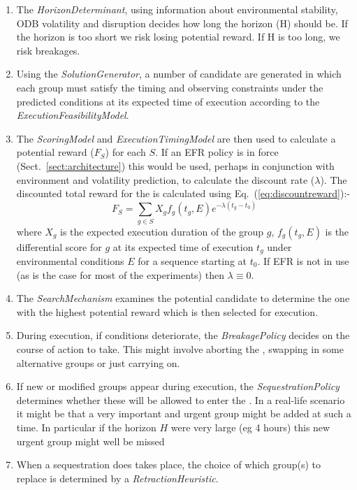 \begin{enumerate}
\item The \emph{HorizonDeterminant}, using information about environmental stability, ODB volatility and disruption decides how long the \echelon horizon (H) should be. If the horizon is too short we risk losing potential reward. If H is too long, we risk breakages.

\item Using the \emph{SolutionGenerator}, a number of candidate \echelons are generated in which each group must satisfy the timing and observing constraints under the predicted conditions at its expected time of execution according to the \emph{ExecutionFeasibilityModel}.

\item The \emph{ScoringModel} and \emph{ExecutionTimingModel} are then used to calculate a potential reward ($F_S$) for each \echelon $S$. If an EFR policy  is in force (Sect.~\ref{sect:architecture}) this would be used, perhaps in conjunction with environment and volatility prediction, to calculate the discount rate ($\lambda$). The discounted total reward for the \echelon is calculated using Eq.~(\ref{eq:discountreward}):-
\begin{equation}
\label{eq:discountreward}
F_S = \sum_{g \in S}{X_g f_g(t_g,E)e^{-\lambda (t_g-t_0)}}
\end{equation}
where $X_g$ is the expected execution duration of the group $g$, $f_g(t_g,E)$ is the differential score for $g$ at its expected time of execution $t_g$ under environmental conditions $E$ for a sequence starting at $t_0$. If EFR is not in use (as is the case for most of the experiments) then $\lambda \equiv 0$.

\item The \emph{SearchMechanism} examines the potential candidate \echelons to determine the one with the highest potential reward which is then selected for execution.

\item During execution, if conditions deteriorate, the \emph{BreakagePolicy} decides on the course of action to take. This might involve aborting the \echelon, swapping in some alternative groups or just carrying on.

\item If new or modified groups appear during execution, the \emph{SequestrationPolicy} determines whether these will be allowed to enter the \echelon. In a real-life scenario it might be that a very important and urgent group might be added at such a time. In particular if the horizon $H$ were very large (eg 4 hours) this new urgent group might well be missed

\item When a sequestration does takes place, the choice of which group(s) to replace is determined by a \emph{RetractionHeuristic}.

\end{enumerate}

